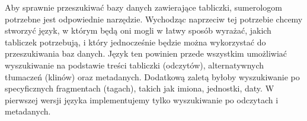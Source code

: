 
Aby sprawnie przeszukiwać bazy danych zawierające tabliczki, sumerologom potrzebne jest odpowiednie narzędzie.
Wychodząc naprzeciw tej potrzebie chcemy stworzyć język, w którym będą oni mogli w łatwy sposób wyrażać, jakich tabliczek potrzebują, i który jednocześnie będzie można wykorzystać do przeszukiwania baz danych. Język ten powinien przede wszystkim umożliwiać wyszukiwanie na podstawie treści tabliczki (odczytów), alternatywnych tłumaczeń (klinów)
oraz metadanych.
Dodatkową zaletą byłoby wyszukiwanie po specyficznych fragmentach (tagach), takich jak imiona, jednostki, daty.
W pierwszej wersji języka implementujemy tylko wyszukiwanie po odczytach i metadanych.